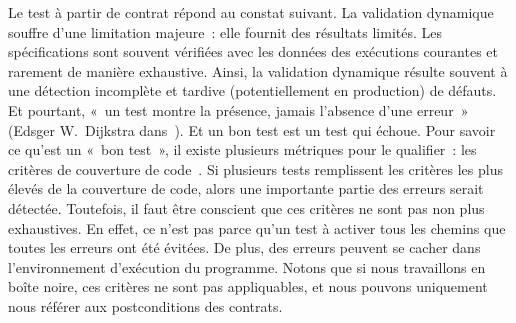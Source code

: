 Le test à partir de contrat répond au constat suivant. La validation
dynamique souffre d'une limitation majeure~: elle fournit des résultats limités.
Les spécifications sont souvent vérifiées avec les données des exécutions
courantes et rarement de manière exhaustive. Ainsi, la validation dynamique
résulte souvent à une détection incomplète et tardive (potentiellement en
production) de défauts. Et pourtant, «~un test montre la présence, jamais
l'absence d'une erreur~» (Edsger W.~Dijkstra dans~). Et un bon
test est un test qui échoue.  Pour savoir ce qu'est un «~bon test~», il existe
plusieurs métriques pour le qualifier~: les critères de couverture de
code~. Si plusieurs tests remplissent
les critères les plus élevés de la couverture de code, alors une importante
partie des erreurs serait détectée. Toutefois, il faut être conscient que ces
critères ne sont pas non plus exhaustives. En effet, ce n'est pas parce qu'un
test à activer tous les chemins que toutes les erreurs ont été évitées. De plus,
des erreurs peuvent se cacher dans l'environnement d'exécution du programme.
Notons que si nous travaillons en boîte noire, ces critères ne sont pas
appliquables, et nous pouvons uniquement nous référer aux postconditions des
contrats.
